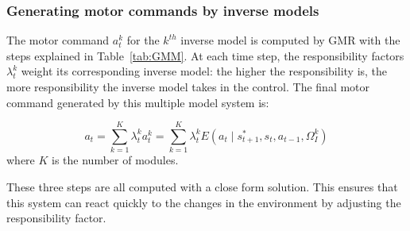 \subsubsection{Generating motor commands by inverse models}
\label{sec:inverse}

The motor command $a^k_t$ for the $k^{th}$ inverse model is computed
by GMR with the steps explained in Table~\ref{tab:GMM}. At each time
step, the responsibility factors $\lambda^k_t$ weight its
corresponding inverse model: the higher the responsibility is, the
more responsibility the inverse model takes in the control. The final
motor command generated by this multiple model system is:

\begin{equation}
\label{e_mix}
a_t = \sum_{k=1}^K{\lambda_t^k a_t^k} = \sum_{k=1}^K{\lambda_t^k E\left({a_t \mid s^*_{t+1},s_t, a_{t-1}, \Omega^k_I}\right)}
\end{equation}
where $K$ is the number of modules.

These three steps are all computed with a close form solution. This ensures that this system can react quickly to the changes in the environment by adjusting the responsibility factor.



